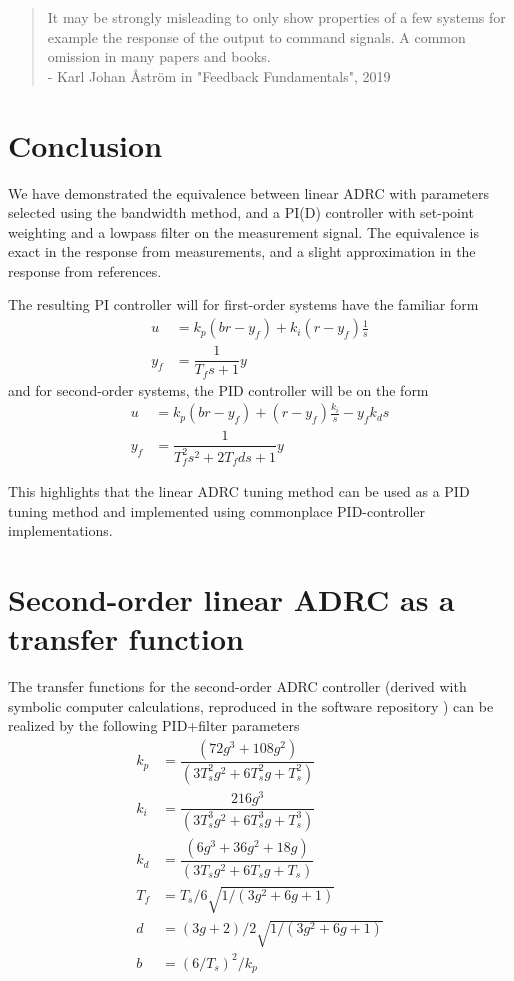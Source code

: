 \documentclass[letterpaper, 10 pt, conference]{ieeeconf}
\begin{document}
\begin{quotation}
	It may be strongly misleading to only show properties of a few systems for example the response of the output to command signals. A common omission in many papers and books.\\
	- Karl Johan Åström in "Feedback Fundamentals", 2019
\end{quotation}


\section{Conclusion}
We have demonstrated the equivalence between linear ADRC with parameters selected using the bandwidth method, and a PI(D) controller with set-point weighting and a lowpass filter on the measurement signal. The equivalence is exact in the response from measurements, and a slight approximation in the response from references. 

The resulting PI controller will for first-order systems have the familiar form
\begin{align}
u &= k_p (br - y_f) + k_i(r-y_f)\frac{1}{s} \\
y_f &= \dfrac{1}{T_f s + 1} y
\end{align}
and for second-order systems, the PID controller will be on the form
\begin{align}
u &= k_p (br - y_f) + (r-y_f)\frac{k_i}{s} - y_fk_d s \\
y_f &= \dfrac{1}{T_f^2s^2 + 2T_f d s + 1} y
\end{align}


This highlights that the linear ADRC tuning method can be used as a PID tuning method and implemented using commonplace PID-controller implementations.






\appendix

\section{Second-order linear ADRC as a transfer function}
The transfer functions for the second-order ADRC controller (derived with symbolic computer calculations, reproduced in the software repository \cite{repo}) can be realized by the following PID+filter parameters
\begin{align}
	k_p &= \dfrac{(72g^3 + 108g^2)}{(3T_s^2 g^2 + 6T_s^2 g + T_s^2)} \\
	k_i &= \dfrac{216g^3}{(3T_s^3 g^2 + 6T_s^3 g + T_s^3)} \\
	k_d &= \dfrac{(6g^3 + 36g^2 + 18g)}{(3T_s g^2 + 6T_s g + T_s)} \\
	T_f &= T_s/6 \sqrt{1/(3g^2 + 6g + 1)} \\
	d &= (3g + 2)/2 \sqrt{1/(3g^2 + 6g + 1)} \\
	b &= (6/T_s)^2 / k_p
\end{align}
\end{document}
